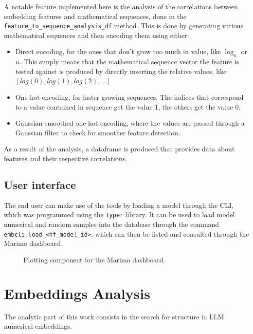 \documentclass[
  a4paper, twoside, 10pt, titlepage]{book}
\makeatletter
\newcommand*\pandocbounded[1]{%
  \sbox\pandoc@box{#1}%
  \Gscale@div\@tempa{\textheight}{\dimexpr\ht\pandoc@box+\dp\pandoc@box\relax}%
  \Gscale@div\@tempb{\linewidth}{\wd\pandoc@box}%
  \ifdim\@tempb\p@<\@tempa\p@\let\@tempa\@tempb\fi%
  \ifdim\@tempa\p@<\p@\scalebox{\@tempa}{\usebox\pandoc@box}%
  \else\usebox{\pandoc@box}%
  \fi%
}
\providecommand{\tightlist}{%
  \setlength{\itemsep}{0pt}\setlength{\parskip}{0pt}}
\makeatother
\begin{document}
A notable feature implemented here is the analysis of the correlations
between embedding features and mathematical sequences, done in the
\texttt{feature\_to\_sequence\_analysis\_df} method. This is done by
generating various mathematical sequences and then encoding them using
either:

\begin{itemize}
\tightlist
\item
  Direct encoding, for the ones that don't grow too much in value, like
  \(\log_n\) or \(n\). This simply means that the mathematical sequence
  vector the feature is tested against is produced by directly inserting
  the relative values, like \([log(0), log(1),
  log(2), \ldots]\)
\item
  One-hot encoding, for faster growing sequences. The indices that
  correspond to a value contained in sequence get the value 1, the
  others get the value 0.
\item
  Gaussian-smoothed one-hot encoding, where the values are passed
  through a Gaussian filter to check for smoother feature detection.
\end{itemize}

As a result of the analysis, a dataframe is produced that provides data
about features and their respective correlations.

\section{User interface}\label{user-interface}

The end user can make use of the tools by loading a model through the
CLI, which was programmed using the \texttt{typer} library. It can be
used to load model numerical and random samples into the database
through the command
\texttt{embcli\ load\ \textless{}hf\_model\_id\textgreater{}}, which can
then be listed and consulted through the Marimo dashboard.

\begin{figure}
\centering
\pandocbounded{\texttt{[image: res/marimo\_dashboard.png]}}
\caption{Plotting component for the Marimo dashboard.}
\end{figure}

\chapter{Embeddings Analysis}\label{embeddings-analysis}

The analytic part of this work consists in the search for structure in
LLM numerical embeddings.
\end{document}
